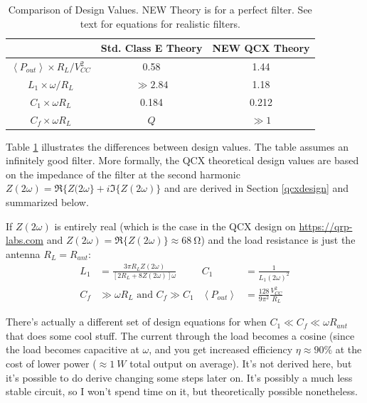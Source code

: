 \documentclass[10pt,letterpaper]{article}
\begin{document}
\begin{table}
\centering
\begin{tabular}{c|cc}
& Std. Class E Theory & NEW QCX Theory \\
\hline
\hline 
$\left\langle P_{out} \right\rangle \times R_L/V_{CC}^2$ & 0.58 & 1.44 \\ \hline
$L_1 \times \omega/ R_L$ & $\gg 2.84$ & 1.18 \\ \hline
$C_1 \times \omega R_L$ & 0.184 & 0.212 \\ \hline
$C_f \times \omega R_L$ & $Q$ & $ \gg 1$ \\ \hline
\end{tabular}
\caption{Comparison of Design Values. NEW Theory is for a perfect filter. See text for equations for realistic filters.}\label{designcomparetable}
\end{table}

Table \ref{designcomparetable} illustrates the differences between design values. The table assumes an infinitely good filter. More formally, the QCX theoretical design values are based on the impedance of the filter at the second harmonic $Z(2\omega)=\Re\{Z(2\omega\}+i\Im\{Z(2\omega)\}$ and are derived in Section \ref{qcxdesign} and summarized below.


If $Z(2\omega)$ is entirely real (which is the case in the QCX design on \url{https://qrp-labs.com} and $Z(2\omega)=\Re\{Z(2\omega)\}\approx\SI{68}{\ohm}$) and the load resistance is just the antenna $R_L=R_{ant}$:
\begin{align*}
L_1&=\frac{3 \pi R_L Z(2\omega) }{[2R_L+8Z(2\omega)]\omega}
& C_1&=\frac{1}{L_1 (2\omega)^2}\\
C_f &\gg \omega R_L \text{ and } C_f \gg C_1
& \left\langle P_{out} \right\rangle & = \frac{128}{9\pi^2}\frac{V_{CC}^2}{R_L}
\end{align*}

There's actually a different set of design equations for when $C_1 \ll C_f \ll \omega R_{ant}$ that does some cool stuff. The current through the load becomes a cosine (since the load becomes capacitive at $\omega$, and you get increased efficiency $\eta \approx 90\%$ at the cost of lower power ($\approx \SI{1}{W}$ total output on average). It's not derived here, but it's possible to do derive changing some steps later on. It's possibly a much less stable circuit, so I won't spend time on it, but theoretically possible nonetheless.
\end{document}
